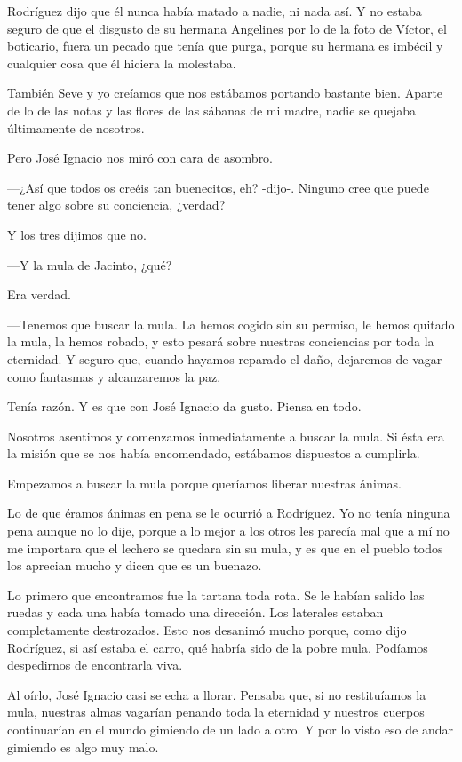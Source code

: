 \documentclass{barcodevapor3pags}
\begin{document}
Rodríguez dijo que él nunca había matado a nadie, ni nada así. Y no
estaba seguro de que el disgusto de su hermana Angelines por lo de la
foto de Víctor, el boticario, fuera un pecado que tenía que purga,
porque su hermana es imbécil y cualquier cosa que él hiciera la
molestaba.~

También Seve y yo creíamos que nos estábamos portando bastante bien.
Aparte de lo de las notas y las flores de las sábanas de mi madre, nadie
se quejaba últimamente de nosotros.~

Pero José Ignacio nos miró con cara de asombro.~

---¿Así que todos os creéis tan buenecitos, eh? -dijo-. Ninguno cree que
puede tener algo sobre su conciencia, ¿verdad?~

Y los tres dijimos que no.~

---Y la mula de Jacinto, ¿qué?~

Era verdad.~

---Tenemos que buscar la mula. La hemos cogido sin su permiso, le hemos
quitado la mula, la hemos robado, y esto pesará sobre nuestras
conciencias por toda la eternidad. Y seguro que, cuando hayamos reparado
el daño, dejaremos de vagar como fantasmas y alcanzaremos la paz.~

Tenía razón. Y es que con José Ignacio da gusto. Piensa en todo.~

Nosotros asentimos y comenzamos inmediatamente a buscar la mula. Si ésta
era la misión que se nos había encomendado, estábamos dispuestos a
cumplirla.




\capitulo
{\Large E}mpezamos a buscar la mula porque queríamos liberar nuestras ánimas.

Lo de que éramos ánimas en pena se le ocurrió a Rodríguez. Yo no tenía
ninguna pena aunque no lo dije, porque a lo mejor a los otros les
parecía mal que a mí no me importara que el lechero se quedara sin su
mula, y es que en el pueblo todos los aprecian mucho y dicen que es un
buenazo.~

Lo primero que encontramos fue la tartana toda rota. Se le habían salido
las ruedas y cada una había tomado una dirección. Los laterales estaban
completamente destrozados. Esto nos desanimó mucho porque, como dijo
Rodríguez, si así estaba el carro, qué habría sido de la pobre mula.
Podíamos despedirnos de encontrarla viva.~

Al oírlo, José Ignacio casi se echa a llorar. Pensaba que, si no
restituíamos la mula, nuestras almas vagarían penando toda la eternidad
y nuestros cuerpos continuarían en el mundo gimiendo de un lado a otro.
Y por lo visto eso de andar gimiendo es algo muy malo.~
\end{document}
